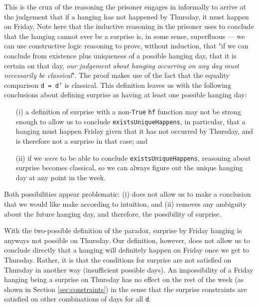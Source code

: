 \documentclass[runningheads]{llncs}
\begin{document}
This is the crux of the reasoning the prisoner
engages in informally to arrive at the judgement that
if a hanging has not happened by Thursday, it must happen on Friday.
Note here that the inductive reasoning in the prisoner uses to conclude that the
hanging cannot ever be a surprise is, in some sense, superfluous --- we can use
constructive logic reasoning to prove, without induction, that "if we can conclude
from existence plus uniqueness of a possible hanging day, that it is certain on that day,
\emph{our judgement about hanging occurring on any day must necessarily be classical}".
The proof makes use of the fact that the equality comparison {\tt d = d'} is
classical. This definition leaves us with the following conclusions about defining surprise as
having at least one possible hanging day:

\begin{itemize}
  \item[(i)] a definition of surprise with a non-{\tt True} {\tt hf} function
  may not be strong enough to allow us to conclude
  {\tt existsUniqueHappens}, in particular, that a hanging
  must happen Friday given that it has not occurred by Thursday, and is
  therefore not a surprise in that case; and \newline
  \item[(ii)] if we \emph{were} to be able to conclude {\tt existsUniqueHappens},
  reasoning about surprise
  becomes classical, so we can always figure out the unique hanging day at any point in the week.
\end{itemize}

Both possibilities appear problematic: (i) does not allow us to make
a conclusion that we would like make according to intuition,
and (ii) removes any ambiguity
about the future hanging day, and therefore, the possibility of surprise.

With the two-possible definition of the paradox, surprise by Friday hanging is anyways
not possible on Thursday.
Our definition, however, does not allow us to conclude directly that a hanging will
definitely happen on Friday once we get to Thursday. Rather, it is that the
conditions for surprise are not satisfied on Thursday in another way (insufficient
possible days). An impossibility of a Friday hanging being a surprise on Thursday has no effect
on the rest of the week (as shown in Section \ref{sec:constraints}) in the sense that
the surprise constraints are satisfied on other combinations of days for all {\tt d}.
\end{document}
